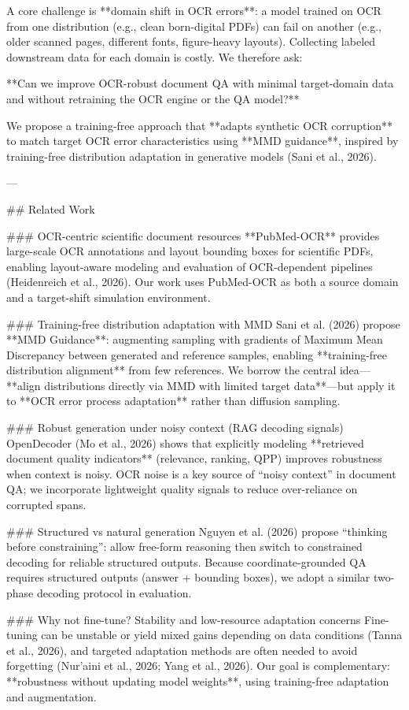 A core challenge is **domain shift in OCR errors**: a model trained on OCR from one distribution (e.g., clean born-digital PDFs) can fail on another (e.g., older scanned pages, different fonts, figure-heavy layouts). Collecting labeled downstream data for each domain is costly. We therefore ask:

**Can we improve OCR-robust document QA with minimal target-domain data and without retraining the OCR engine or the QA model?**

We propose a training-free approach that **adapts synthetic OCR corruption** to match target OCR error characteristics using **MMD guidance**, inspired by training-free distribution adaptation in generative models (Sani et al., 2026).  

---

## Related Work  

### OCR-centric scientific document resources  
**PubMed-OCR** provides large-scale OCR annotations and layout bounding boxes for scientific PDFs, enabling layout-aware modeling and evaluation of OCR-dependent pipelines (Heidenreich et al., 2026). Our work uses PubMed-OCR as both a source domain and a target-shift simulation environment.

### Training-free distribution adaptation with MMD  
Sani et al. (2026) propose **MMD Guidance**: augmenting sampling with gradients of Maximum Mean Discrepancy between generated and reference samples, enabling **training-free distribution alignment** from few references. We borrow the central idea—**align distributions directly via MMD with limited target data**—but apply it to **OCR error process adaptation** rather than diffusion sampling.

### Robust generation under noisy context (RAG decoding signals)  
OpenDecoder (Mo et al., 2026) shows that explicitly modeling **retrieved document quality indicators** (relevance, ranking, QPP) improves robustness when context is noisy. OCR noise is a key source of “noisy context” in document QA; we incorporate lightweight quality signals to reduce over-reliance on corrupted spans.

### Structured vs natural generation  
Nguyen et al. (2026) propose “thinking before constraining”: allow free-form reasoning then switch to constrained decoding for reliable structured outputs. Because coordinate-grounded QA requires structured outputs (answer + bounding boxes), we adopt a similar two-phase decoding protocol in evaluation.

### Why not fine-tune? Stability and low-resource adaptation concerns  
Fine-tuning can be unstable or yield mixed gains depending on data conditions (Tanna et al., 2026), and targeted adaptation methods are often needed to avoid forgetting (Nur’aini et al., 2026; Yang et al., 2026). Our goal is complementary: **robustness without updating model weights**, using training-free adaptation and augmentation.

